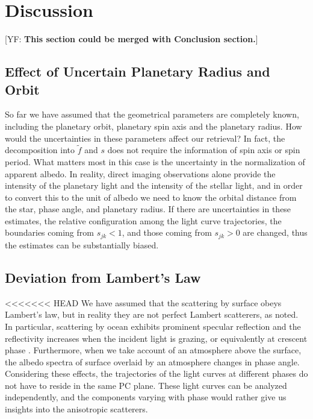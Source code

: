 \documentclass[iop,numberedappendix,apj,]{emulateapj}
\def\fast{\tilde f}
\def\memoYF#1{\color{red}[YF: {\bf #1}]\color{black}}
\begin{document}
\section{Discussion}
\label{s:discussion}

\memoYF{This section could be merged with Conclusion section.}

\subsection{Effect of Uncertain Planetary Radius and Orbit}

So far we have assumed that the geometrical parameters are completely known, including the planetary orbit, planetary spin axis and the planetary radius. 
How would the uncertainties in these parameters affect our retrieval?
In fact, the decomposition into $\fast $ and $s$ does not require the information of spin axis or spin period. 
What matters most in this case is the uncertainty in the normalization of apparent albedo. 
In reality, direct imaging observations alone provide the intensity of the 
planetary light and the intensity of the stellar light, and in order to convert this to the unit of albedo we need to know the orbital distance from the star, phase angle, and planetary radius. 
If there are uncertainties in these estimates, the relative configuration among the light curve trajectories, the boundaries coming from $s_{jk} < 1$, and those coming from $s_{jk} > 0$ are changed, thus the estimates can be substantially biased. 

\subsection{Deviation from Lambert's Law}

<<<<<<< HEAD
We have assumed that the scattering by surface obeys Lambert's law, but in reality they are not perfect Lambert scatterers, as noted. 
In particular, scattering by ocean exhibits prominent specular reflection and the reflectivity increases when the incident light is grazing, or equivalently at crescent phase \citep[e.g.,][]{Williams2008}. 
Furthermore, when we take account of an atmosphere above the surface, the albedo spectra of surface overlaid by an atmosphere changes in phase angle.  
Considering these effects, the trajectories of the light curves at different phases do not have to reside in the same PC plane. 
These light curves can be analyzed independently, and the components varying with phase would rather give us insights into the anisotropic scatterers. 
\end{document}
